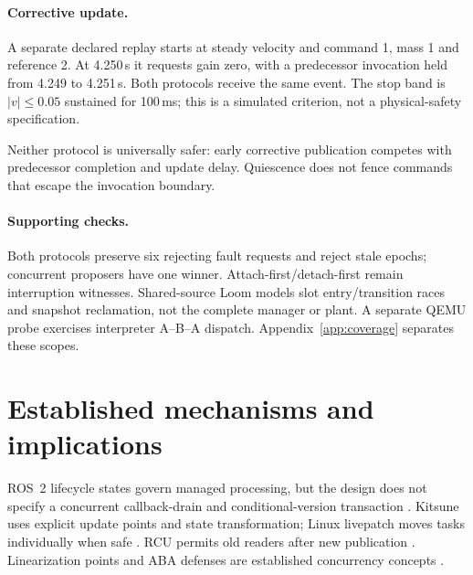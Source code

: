 \documentclass{article}
\begin{document}
\LatencyInterpretation{}

\paragraph{Corrective update.}
A separate declared replay starts at steady velocity and command 1, mass 1 and reference 2. At 4.250\,s it requests gain zero, with a predecessor invocation held from 4.249 to 4.251\,s. Both protocols receive the same event. The stop band is $|v|\leq0.05$ sustained for 100\,ms; this is a simulated criterion, not a physical-safety specification.

\begin{table}[!ht]
\caption{Corrective replay. Delay is from the common fault/request to observed publication; command integral uses the common fault-to-8\,s horizon. Stop time is band entry after the fault, confirmed for 100\,ms. Command values are simulation units.}
\label{tab:stop}
\centering\small

\end{table}

\StopInterpretation{}
Neither protocol is universally safer: early corrective publication competes with predecessor completion and update delay. Quiescence does not fence commands that escape the invocation boundary.

\paragraph{Supporting checks.}
Both protocols preserve six rejecting fault requests and reject stale epochs; concurrent proposers have one winner. Attach-first/detach-first remain interruption witnesses. Shared-source Loom models slot entry/transition races and snapshot reclamation, not the complete manager or plant. A separate QEMU probe exercises interpreter A--B--A dispatch. Appendix~\ref{app:coverage} separates these scopes.

\section{Established mechanisms and implications}
ROS~2 lifecycle states govern managed processing, but the design does not specify a concurrent callback-drain and conditional-version transaction \citep{macenski2022ros2,ros2lifecycle}. Kitsune uses explicit update points and state transformation; Linux livepatch moves tasks individually when safe \citep{hayden2014kitsune,linuxlivepatch}. RCU permits old readers after new publication \citep{linuxrcu}. Linearization points and ABA defenses are established concurrency concepts \citep{herlihy1990linearizability,michael2004hazard}.
\end{document}
